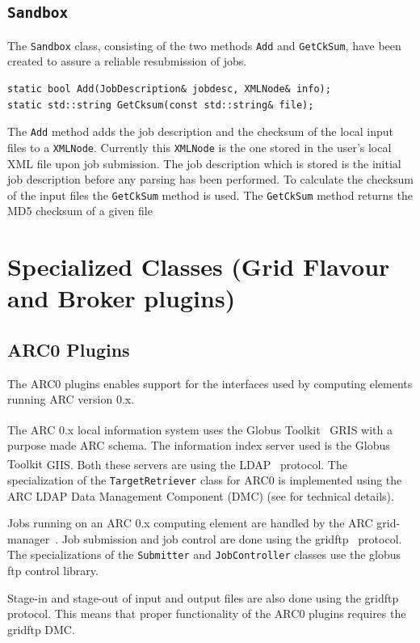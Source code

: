 \documentclass{book}
\newcommand{\GT}{Globus Toolkit\textsuperscript{\textregistered}}
\newcommand{\JobController}{\texttt{JobController}}
\newcommand{\TargetRetriever}{\texttt{TargetRetriever}}
\newcommand{\Sandbox}{\texttt{Sandbox}}
\newcommand{\Submitter}{\texttt{Submitter}}
\newcommand{\XMLNode}{\texttt{XMLNode}}
\begin{document}
\subsection{{\Sandbox}}
The {\Sandbox} class, consisting of the two methods \texttt{Add} and 
\texttt{GetCkSum}, have been created to assure a reliable resubmission 
of jobs. 
\begin{shaded}
\begin{verbatim}
static bool Add(JobDescription& jobdesc, XMLNode& info);
static std::string GetCksum(const std::string& file);
\end{verbatim}
\end{shaded}
The \texttt{Add} method  adds the job description and the checksum of 
the local input files to a {\XMLNode}. Currently this {\XMLNode} is the one 
stored in the user's local XML file upon job submission. The job 
description which is stored is the initial job description before any 
parsing has been performed. To calculate the checksum of the input 
files the \texttt{GetCkSum} method is used. The \texttt{GetCkSum} 
method returns the MD5 checksum of a given file 

\section{Specialized Classes (Grid Flavour and Broker plugins)}
\label{sec:plugins}

\subsection{ARC0 Plugins}

The ARC0 plugins enables support for the interfaces used by computing
elements running ARC version 0.x.

The ARC 0.x local information system uses the {\GT}~\cite{globus} GRIS
with a purpose made ARC schema. The information index server used is the
{\GT} GIIS. Both these servers are using the LDAP~\cite{ldap}
protocol. The specialization of the {\TargetRetriever} class for ARC0
is implemented using the ARC LDAP Data Management Component (DMC) (see
\cite{hed} for technical details).

Jobs running on an ARC 0.x computing element are handled by the ARC
grid-manager~\cite{gm}. Job submission and job control are done using
the gridftp~\cite{gridftp} protocol. The specializations of the
{\Submitter} and {\JobController} classes use the globus ftp control
library.

Stage-in and stage-out of input and output files are also done using
the gridftp~\cite{gridftp} protocol. This means that proper
functionality of the ARC0 plugins requires the gridftp DMC.
\end{document}
